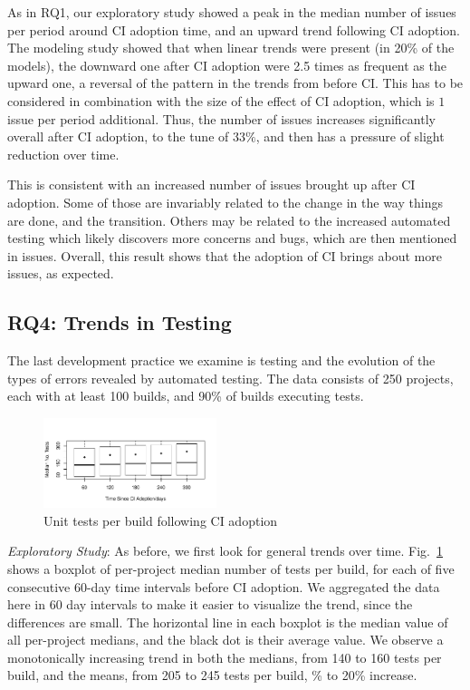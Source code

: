As in RQ1, our exploratory study showed a peak in the median number of issues per period around CI adoption time, and an upward trend following CI adoption.
The modeling study showed that when linear trends were present (in 20\% 
of the models), the downward one after CI adoption were 2.5 times as frequent 
as the upward one, a reversal of the pattern in the trends from before CI.
This has to be considered in combination with the size of the effect of CI adoption, which is $1$ issue per period additional.
Thus, the number of issues increases significantly overall after CI adoption, to the tune of $33\%$, and then has a pressure of slight reduction over time.

This is consistent with an increased number of issues brought up after CI adoption. Some of those are invariably related to the change in the way things are done, and the transition. Others may be related to the increased automated testing which likely discovers more concerns and bugs, which are then mentioned in issues.
Overall, this result shows that the adoption of CI brings about more issues, as expected.




\subsection{RQ4: Trends in Testing}

The last development practice we examine is testing and the evolution 
of the types of errors revealed by automated testing.
The data consists of 250 projects, each with at least 100 builds, and 90\% 
of builds executing tests.

\begin{figure}[!t]
\centering
\includegraphics[width=0.45\textwidth, clip=true, trim=0 15 15 50]{tests.pdf}
\caption{Unit tests per build following CI adoption}
\label{Fig:Tests}
\end{figure}

\smallskip\noindent \emph{Exploratory Study}: 
As before, we first look for general trends over time.
Fig.~\ref{Fig:Tests} shows a boxplot of per-project median number of tests 
per build, for each of five consecutive 60-day time intervals before CI adoption.
We aggregated the data here in 60 day intervals to make it easier to visualize 
the trend, since the differences are small.
The horizontal line in each boxplot is the median value of all per-project medians, 
and the black dot is their average value.
We observe a monotonically increasing trend in both the medians, from 140 to 
160 tests per build, and the means, from 205 to 245 tests per build, \% to 
20\% increase. 


